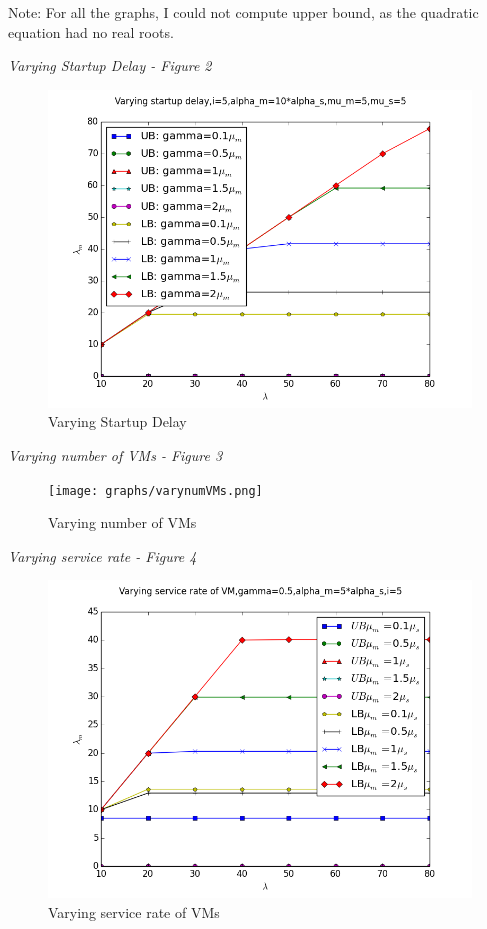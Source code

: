 \documentclass[letter,11pt]{article}
\begin{document}
\begin{itemize}
Note: For all the graphs, I could not compute upper bound, as the quadratic equation had no real roots.


\textit{Varying Startup Delay - Figure 2}

\begin{figure}[h]
    \centering
    \includegraphics[width=1.2\textwidth]{graphs/varystartupdelay.png}
    \caption{Varying Startup Delay}
    \label{fig:varystartupdelay}
\end{figure}

\textit{Varying number of VMs  - Figure 3}
\begin{figure}[h]
    \centering
    \texttt{[image: graphs/varynumVMs.png]}
    \caption{Varying number of VMs}
    \label{fig:varynumVMs}
\end{figure}

\textit{Varying service rate  - Figure 4}

\begin{figure}[h]
    \centering
    \includegraphics[width=1.2\textwidth]{graphs/varyservicerate.png}
    \caption{Varying service rate of VMs}
    \label{fig:varyservicerate}
\end{figure}

\end{itemize}
\end{document}

